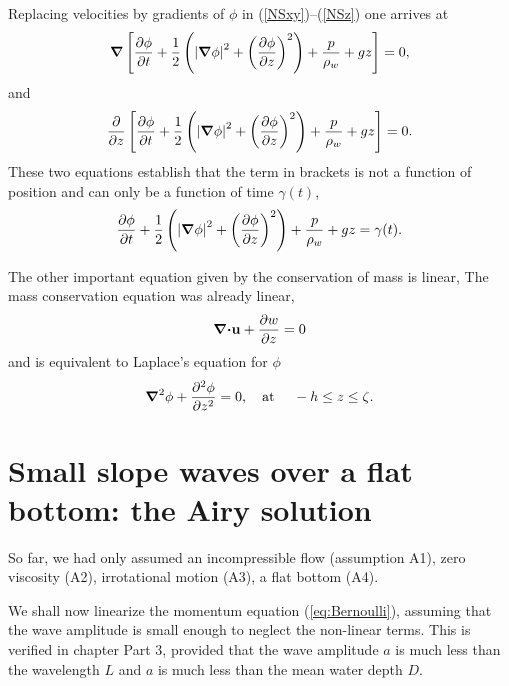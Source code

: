 Replacing velocities by gradients of $\phi$ in
(\ref{NSxy})--(\ref{NSz}) one arrives at
\begin{equation}
    \mbox{\boldmath $\nabla$} \left[\frac{\partial \phi}{\partial t}
    +\frac{1}{2}\left(
    \left|\mbox{\boldmath $\nabla$} \phi\right|^2
    +\left(\frac{\partial \phi}{\partial z}\right)^2
    \right)
    +\frac{p}{\rho_w}+gz \right]=0,
\end{equation}
and
\begin{equation}
    \frac{\partial}{\partial z} \left[\frac{\partial \phi}{\partial t}
    +\frac{1}{2}\left(
    \left|\mbox{\boldmath $\nabla$} \phi\right|^2
    +\left(\frac{\partial \phi}{\partial z}\right)^2
    \right)
    +\frac{p}{\rho_w}+gz \right]=0.\label{eq:NStoBer}
\end{equation}
These two equations establish that the term in brackets is not a function of position and can 
only be a function of time $\gamma(t)$, 
\begin{equation}
    \frac{\partial \phi}{\partial t}
    +\frac{1}{2}\left(
    \left|\mbox{\boldmath $\nabla$} \phi\right|^2
    +\left(\frac{\partial \phi}{\partial z}\right)^2
    \right)
    +\frac{p}{\rho_w}+gz =\gamma(t).\label{eq:Bernoulli}
\end{equation}

The other important equation given by the conservation of mass is linear, 
The mass conservation equation was already linear, 
\begin{equation}
\mbox{\boldmath $\nabla$} \mbox{\boldmath $\cdot$} {\mathbf u} + \frac{\partial w}{\partial z} =0
\end{equation}
and is equivalent to Laplace's equation for $\phi$
\begin{equation}
    \mbox{\boldmath $\nabla$}^2 \phi + \frac{\partial^2 \phi}{\partial z^2}=0,
    \quad \mbox{at\ }\quad -h\leq z \leq \zeta. \label{Laplace}
\end{equation}


\section{Small slope waves over a flat bottom: the Airy solution}
So far, we had only assumed an incompressible flow (assumption A1), zero viscosity (A2), 
irrotational motion (A3), a flat bottom (A4). 


We shall now linearize the momentum equation (\ref{eq:Bernoulli}), assuming that the wave amplitude is small enough to 
neglect the non-linear terms. This is verified in chapter Part 3, provided that 
the wave amplitude $a$ is much less than the wavelength $L$ and $a$ is much less than the mean water depth $D$. 


